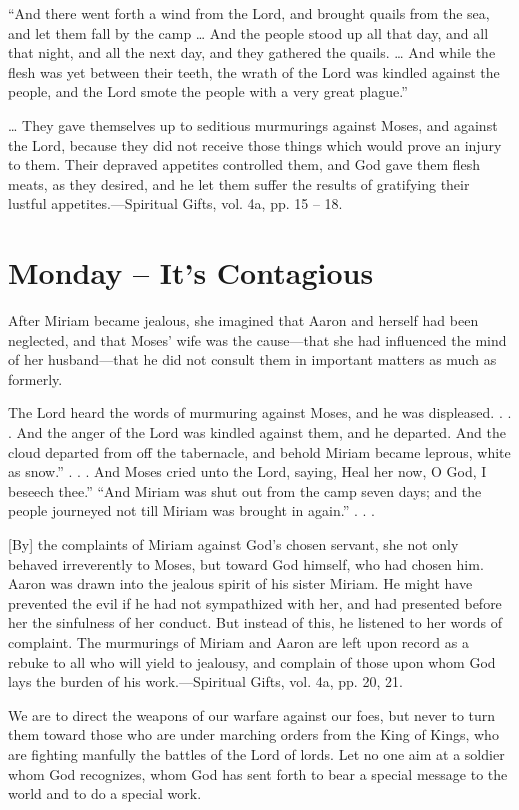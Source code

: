 \documentclass[a4paper, 10pt, twoside, headings=small]{scrartcl}
\begin{document}
\begin{multicols}{2}
“And there went forth a wind from the Lord, and brought quails from the sea, and let them fall by the camp … And the people stood up all that day, and all that night, and all the next day, and they gathered the quails. … And while the flesh was yet between their teeth, the wrath of the Lord was kindled against the people, and the Lord smote the people with a very great plague.”

… They gave themselves up to seditious murmurings against Moses, and against the Lord, because they did not receive those things which would prove an injury to them. Their depraved appetites controlled them, and God gave them flesh meats, as they desired, and he let them suffer the results of gratifying their lustful appetites.—Spiritual Gifts, vol. 4a, pp. 15 – 18.

\section*{Monday – It’s Contagious}

After Miriam became jealous, she imagined that Aaron and herself had been neglected, and that Moses’ wife was the cause—that she had influenced the mind of her husband—that he did not consult them in important matters as much as formerly.

The Lord heard the words of murmuring against Moses, and he was displeased. . . . And the anger of the Lord was kindled against them, and he departed. And the cloud departed from off the tabernacle, and behold Miriam became leprous, white as snow.” . . . And Moses cried unto the Lord, saying, Heal her now, O God, I beseech thee.” “And Miriam was shut out from the camp seven days; and the people journeyed not till Miriam was brought in again.” . . .

[By] the complaints of Miriam against God’s chosen servant, she not only behaved irreverently to Moses, but toward God himself, who had chosen him. Aaron was drawn into the jealous spirit of his sister Miriam. He might have prevented the evil if he had not sympathized with her, and had presented before her the sinfulness of her conduct. But instead of this, he listened to her words of complaint. The murmurings of Miriam and Aaron are left upon record as a rebuke to all who will yield to jealousy, and complain of those upon whom God lays the burden of his work.—Spiritual Gifts, vol. 4a, pp. 20, 21.

We are to direct the weapons of our warfare against our foes, but never to turn them toward those who are under marching orders from the King of Kings, who are fighting manfully the battles of the Lord of lords. Let no one aim at a soldier whom God recognizes, whom God has sent forth to bear a special message to the world and to do a special work.


\end{multicols}
\end{document}
